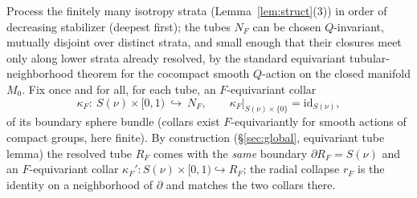\documentclass[12pt]{article}
\theoremstyle{definition}
\begin{document}
Process the finitely many isotropy strata (Lemma~\ref{lem:struct}(3)) in order
of decreasing stabilizer (deepest first); the tubes $N_F$ can be chosen
$Q$-invariant, mutually disjoint over distinct strata, and small enough that
their closures meet only along lower strata already resolved, by the standard
equivariant tubular-neighborhood theorem for the cocompact smooth $Q$-action on
the closed manifold $M_0$. Fix once and for all, for each tube, an
$F$-equivariant collar
\[
   \kappa_F\colon\ S(\nu)\times[0,1)\ \hookrightarrow\ N_F,\qquad
   \kappa_F|_{S(\nu)\times\{0\}}=\mathrm{id}_{S(\nu)},
\]
of its boundary sphere bundle (collars exist $F$-equivariantly for smooth
actions of compact groups, here finite). By construction (\S\ref{sec:global},
equivariant tube lemma) the resolved tube $R_F$ comes with the \emph{same}
boundary $\partial R_F=S(\nu)$ and an $F$-equivariant collar
$\kappa_F'\colon S(\nu)\times[0,1)\hookrightarrow R_F$; the radial collapse
$r_F$ is the identity on a neighborhood of $\partial$ and matches the two collars
there.
\end{document}
